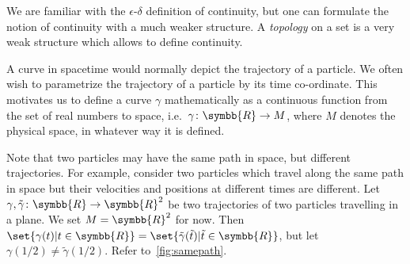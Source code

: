 \documentclass[a4 paper, 11pt]{book}
\theoremstyle{definition}
\newcommand{\rr}{\symbb{R}}
\begin{document}
    We are familiar with the \(\epsilon\)\nobreakdash-\(\delta\) definition of continuity, but one can formulate the notion of continuity with a much weaker structure. A \textit{topology} on a set is a very weak structure which allows to define continuity.

    A curve in spacetime would normally depict the trajectory of a particle. We often wish to parametrize the trajectory of a particle by its time co-ordinate. This motivates us to define a curve \(\gamma\) mathematically as a continuous function from the set of real numbers to space, i.e.\ \(\gamma \colon \rr \rightarrow M\), where \(M\) denotes the physical space, in whatever way it is defined.

    Note that two particles may have the same path in space, but different trajectories. For example, consider two particles which travel along the same path in space but their velocities and positions at different times are different. Let \(\gamma, \tilde\gamma \colon \rr \rightarrow \rr^2\) be two trajectories of two particles travelling in a plane. We set \(M = \rr^2\) for now. Then \(\set{\gamma(t) | t \in \rr} = \set{\tilde\gamma(\tilde t) | \tilde t \in \rr}\), but let \(\gamma(1/2) \neq \tilde\gamma(1/2)\). Refer to~\cref{fig:samepath}.
\end{document}
